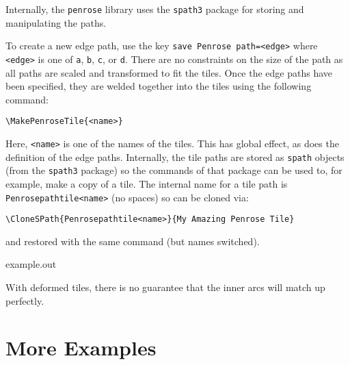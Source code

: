 \documentclass{ltxdoc}
\newenvironment{example}
  {\VerbatimEnvironment
   \begin{VerbatimOut}{example.out}}
  {\end{VerbatimOut}
   \begin{center}
   \setlength{\parindent}{0pt}
   \fbox{\begin{minipage}{.9\linewidth}
     \lstset{breakatwhitespace=true,breaklines=true,language=TeX,basicstyle=\small}
     
   \end{minipage}}

   \fbox{\begin{minipage}{.9\linewidth}
     \centering
     
   \end{minipage}}
\end{center}
}
\begin{document}
Internally, the \Verb+penrose+ library uses the \Verb+spath3+ package for storing and manipulating the paths.

To create a new edge path, use the key \Verb+save Penrose path=<edge>+ where \Verb+<edge>+ is one of \Verb+a+, \Verb+b+, \Verb+c+, or \Verb+d+.
There are no constraints on the size of the path as all paths are scaled and transformed to fit the tiles.
Once the edge paths have been specified, they are welded together into the tiles using the following command:
%
\begin{verbatim}
\MakePenroseTile{<name>}
\end{verbatim}
%
Here, \Verb+<name>+ is one of the names of the tiles.
This has global effect, as does the definition of the edge paths.
Internally, the tile paths are stored as \Verb+spath+ objects (from the \Verb+spath3+ package) so the commands of that package can be used to, for example, make a copy of a tile.
The internal name for a tile path is \Verb+Penrosepathtile<name>+ (no spaces) so can be cloned via:
%
\begin{verbatim}
\CloneSPath{Penrosepathtile<name>}{My Amazing Penrose Tile}
\end{verbatim}
%
and restored with the same command (but names switched).

\begin{example}
\end{example}

With deformed tiles, there is no guarantee that the inner arcs will match up perfectly.

\section{More Examples}
\end{document}
